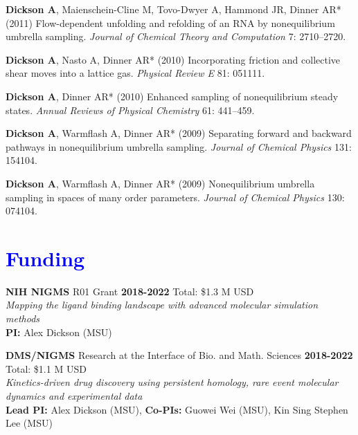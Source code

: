 \documentclass[margin,line]{res}
\begin{document}
\begin{resume}
\begin{spacing}{1.2}
\begin{thebibliography}{10}
{\bf Dickson A}, Maienschein-Cline M, Tovo-Dwyer A, Hammond JR, Dinner AR* (2011)
  Flow-dependent unfolding and refolding of an {RNA} by nonequilibrium umbrella
  sampling.
\newblock \textit{Journal of Chemical Theory and Computation} 7: 2710--2720.

{\bf Dickson A}, Nasto A, Dinner AR* (2010) {Incorporating friction and collective
  shear moves into a lattice gas.}
\newblock \textit{Physical Review E} 81: 051111.

{\bf Dickson A}, Dinner AR* (2010) Enhanced sampling of nonequilibrium steady states.
\newblock \textit{Annual Reviews of Physical Chemistry} 61: 441--459.

{\bf Dickson A}, Warmflash A, Dinner AR* (2009) Separating forward and backward
  pathways in nonequilibrium umbrella sampling.
\newblock \textit{Journal of Chemical Physics} 131: 154104.

{\bf Dickson A}, Warmflash A, Dinner AR* (2009) Nonequilibrium umbrella sampling in
  spaces of many order parameters.
\newblock \textit{Journal of Chemical Physics} 130: 074104.

\end{thebibliography}
\end{spacing}
\endgroup

\section{\sc \textcolor{blue}{Funding} }

{\bf NIH NIGMS} R01 Grant \hfill {\bf 2018-2022} Total: \$1.3 M USD \\
\emph{Mapping the ligand binding landscape with advanced molecular simulation methods}\\
{\bf PI:} Alex Dickson (MSU)

{\bf DMS/NIGMS} Research at the Interface of Bio. and Math. Sciences \hfill {\bf 2018-2022} Total: \$1.1 M USD \\
 \emph{Kinetics-driven drug discovery using persistent homology, rare event molecular dynamics and experimental data}\\
 {\bf Lead PI:} Alex Dickson (MSU), {\bf Co-PIs:} Guowei Wei (MSU), Kin Sing Stephen Lee (MSU)\\


\end{resume}
\end{document}
